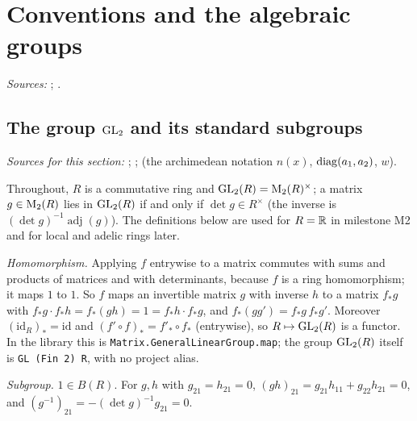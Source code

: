 
\chapter{Conventions and the algebraic groups}\label{ch:ch-0-01-conventions}

\noindent\emph{Sources:} \cite[§§2, 5]{AIntro}; \cite[Lecture IV §1]{Gel}.

\section{\texorpdfstring{The group $\mathrm{GL}_2$ and its standard subgroups}{The group GL₂ and its standard subgroups}}\label{sec:conv-subgroups}

\noindent\emph{Sources for this section:} \cite[§2]{AIntro}; \cite[Lecture IV §1]{Gel}; \cite[§5]{JL} (the
archimedean notation $n(x)$, $\operatorname{diag}(a_1,a_2)$, $w$).

Throughout, $R$ is a commutative ring and $\mathrm{GL}_2(R)=\mathrm{M}_2(R)^\times$; a matrix $g\in\mathrm{M}_2(R)$ lies in $\mathrm{GL}_2(R)$ if
and only if $\det g\in R^\times$ (the inverse is $(\det g)^{-1}\operatorname{adj}(g)$). The definitions below are
used for $R=\mathbb{R}$ in milestone M2 and for local and adelic rings later.

\begin{definition}
\end{definition}
\noindent\emph{Homomorphism.} Applying $f$ entrywise to a matrix commutes with sums and products of matrices and
with determinants, because $f$ is a ring homomorphism; it maps $1$ to $1$. So $f$ maps an invertible matrix $g$ with inverse
$h$ to a matrix $f_*g$ with $f_*g\cdot f_*h=f_*(gh)=1=f_*h\cdot f_*g$, and $f_*(gg')=f_*g\,f_*g'$. Moreover
$(\mathrm{id}_R)_*=\mathrm{id}$ and $(f'\circ f)_*=f'_*\circ f_*$ (entrywise), so $R\mapsto\mathrm{GL}_2(R)$ is a functor. In
the library this is \texttt{Matrix.GeneralLinearGroup.map}; the group $\mathrm{GL}_2(R)$ itself is \texttt{GL (Fin 2) R}, with no
project alias.

\begin{definition}
\end{definition}
\noindent\emph{Subgroup.} $1\in B(R)$. For $g,h$ with $g_{21}=h_{21}=0$, $(gh)_{21}=g_{21}h_{11}+g_{22}h_{21}=0$, and
$(g^{-1})_{21}=-(\det g)^{-1}g_{21}=0$.

